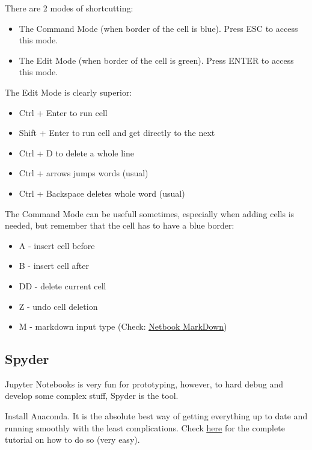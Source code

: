 \begin{center}
    There are 2 modes of shortcutting: 
\begin{itemize}
    \item The Command Mode (when border of the cell is blue). Press ESC to 
    access this mode.
    \item The Edit Mode (when border of the cell is green). Press ENTER to access this mode.
\end{itemize}

The Edit Mode is clearly superior: 
\begin{itemize}
    \item Ctrl + Enter to run cell
    \item Shift + Enter to run cell and get directly to the next
    \item Ctrl + D to delete a whole line
    \item Ctrl + arrows jumps words (usual)
    \item Ctrl + Backspace deletes whole word (usual)
\end{itemize} 

The Command Mode can be usefull sometimes, especially when adding cells is needed, but remember that the cell has to have a blue border:
\begin{itemize}
    \item A - insert cell before
    \item B - insert cell after
    \item DD - delete current cell
    \item Z - undo cell deletion
    \item M - markdown input type (Check: \href{https://gtribello.github.io/mathNET/assets/notebook-writing.html}{\ul{Netbook MarkDown}})
\end{itemize}


\end{center}



\subsection{Spyder}

Jupyter Notebooks is very fun for prototyping, however, to hard debug and develop some complex stuff, Spyder is the tool.

Install Anaconda. It is the absolute best way of getting everything up to date and running smoothly with the least complications. Check \href{https://linuxize.com/post/how-to-install-anaconda-on-ubuntu-18-04/}{\ul{here}} for the complete tutorial on how to do so (very easy).


